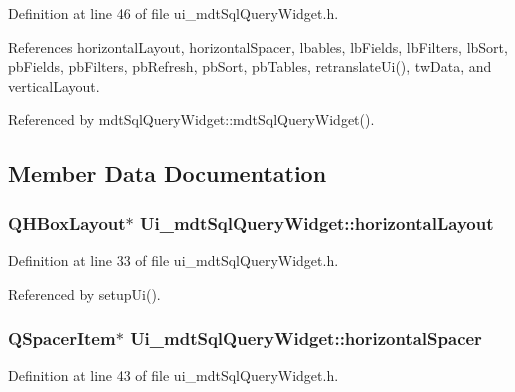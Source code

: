 Definition at line 46 of file ui\-\_\-mdt\-Sql\-Query\-Widget.\-h.



References horizontal\-Layout, horizontal\-Spacer, lbables, lb\-Fields, lb\-Filters, lb\-Sort, pb\-Fields, pb\-Filters, pb\-Refresh, pb\-Sort, pb\-Tables, retranslate\-Ui(), tw\-Data, and vertical\-Layout.



Referenced by mdt\-Sql\-Query\-Widget\-::mdt\-Sql\-Query\-Widget().



\subsection{Member Data Documentation}
\hypertarget{class_ui__mdt_sql_query_widget_a531b35390589ac484e2882bf135c39c7}{
\subsubsection[{horizontal\-Layout}]{\setlength{\rightskip}{0pt plus 5cm}Q\-H\-Box\-Layout$\ast$ Ui\-\_\-mdt\-Sql\-Query\-Widget\-::horizontal\-Layout}}\label{class_ui__mdt_sql_query_widget_a531b35390589ac484e2882bf135c39c7}


Definition at line 33 of file ui\-\_\-mdt\-Sql\-Query\-Widget.\-h.



Referenced by setup\-Ui().

\hypertarget{class_ui__mdt_sql_query_widget_a78a8f55b56a47d05cd233c960c28b8d7}{
\subsubsection[{horizontal\-Spacer}]{\setlength{\rightskip}{0pt plus 5cm}Q\-Spacer\-Item$\ast$ Ui\-\_\-mdt\-Sql\-Query\-Widget\-::horizontal\-Spacer}}\label{class_ui__mdt_sql_query_widget_a78a8f55b56a47d05cd233c960c28b8d7}


Definition at line 43 of file ui\-\_\-mdt\-Sql\-Query\-Widget.\-h.



